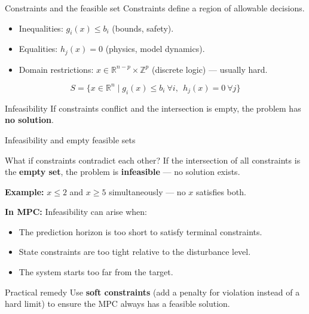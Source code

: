 \documentclass[aspectratio=169,10pt]{beamer}
\newcommand{\R}{\mathbb{R}}
\newcommand{\Z}{\mathbb{Z}}
\begin{document}
\begin{frame}{Constraints and the feasible set}
Constraints define a region of allowable decisions.

\begin{itemize}
  \item Inequalities: $g_i(x)\le b_i$ (bounds, safety).
  \item Equalities: $h_j(x)=0$ (physics, model dynamics).
  \item Domain restrictions: $x\in\R^{n-p}\times\Z^p$ (discrete logic) --- usually hard.
\end{itemize}

\begin{equation*}
S=\{x\in\R^n \mid g_i(x)\le b_i\ \forall i,\ \ h_j(x)=0\ \forall j\}
\end{equation*}

\begin{alertbox}{Infeasibility}
If constraints conflict and the intersection is empty, the problem has \textbf{no solution}.
\end{alertbox}
\end{frame}

\begin{frame}{Infeasibility and empty feasible sets}
\begin{alertbox}{What if constraints contradict each other?}
If the intersection of all constraints is the \textbf{empty set}, the problem is \textbf{infeasible} --- no solution exists.
\end{alertbox}

\textbf{Example:} $x \le 2$ and $x \ge 5$ simultaneously --- no $x$ satisfies both.

\vspace{0.5em}
\textbf{In MPC:} Infeasibility can arise when:
\begin{itemize}
  \item The prediction horizon is too short to satisfy terminal constraints.
  \item State constraints are too tight relative to the disturbance level.
  \item The system starts too far from the target.
\end{itemize}

\begin{notebox}{Practical remedy}
Use \textbf{soft constraints} (add a penalty for violation instead of a hard limit) to ensure the MPC always has a feasible solution.
\end{notebox}
\end{frame}
\end{document}
